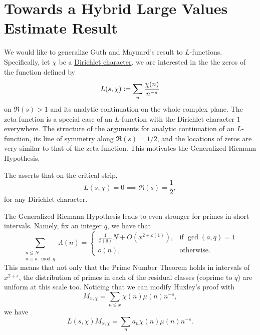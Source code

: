  \chapter{Towards a Hybrid Large Values Estimate Result}

\iffalse

\textit{Here I will document some progress with working with
the hybrid version of Guth-Maynard. This section will be removed when I send the draft to Prof. Wunsch.}
\fi
We would like to generalize Guth and Maynard's result to $L$-functions. Specifically, let $\chi$ be a \hyperref[dcharacter]{Dirichlet character}. we are interested in the the zeros of the function defined by \[
L(s,\chi)\mathrel{\mathop:}=\sum_{n} \frac{\chi(n)}{n^{-s}}
\]
on $\Re(s)>1$ and its analytic continuation on the whole complex plane. The zeta function is a special case of an $L$-function with the Dirichlet character $1$ everywhere. The structure of the arguments for analytic continuation of an $L$-function, its line of symmetry along $\Re(s) = 1/2$, and the locations of zeros are very similar to that of the zeta function. This motivates the Generalized Riemann Hypothesis. \begin{conjecture} 
    The  asserts that on the critical strip, \[
    L(s,\chi)=0 \implies \Re(s)=\frac{1}{2},
    \]
    for any Dirichlet character.
\end{conjecture}
The Generalized Riemann Hypothesis leads to even stronger for primes in short intervals. Namely, fix an integer $q$, we have that \[
\sum_{\substack{n\leq N\\ n\equiv a\mod q}}\Lambda(n) = \begin{cases}
    \frac{1}{\phi(q)} N + O(x^{2+o(1)}), & \textrm{if $\gcd(a,q)=1$}\\
    o(n),& \textrm{otherwise.}
\end{cases}
\]
This means that not only that the Prime Number Theorem holds in intervals of $x^{2+\epsilon}$, the distribution of primes in each of the residual classes (coprime to $q$) are uniform at this scale too. Noticing that we can modify Huxley's proof with \[
M_{x,\chi} = \sum_{n\leq x} \chi(n) \mu(n) n^{-s},
\]
we have \[
L(s,\chi)M_{x,\chi} = \sum_{n} a_n \chi(n) \mu(n) n^{-s}.
\]

